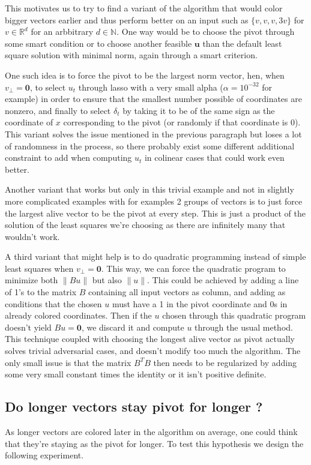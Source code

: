 \documentclass[12pt]{article}
\begin{document}
This motivates us to try to find a variant of the algorithm that would color bigger vectors earlier and thus perform better on an input such as $\{v,v,v,3v\}$ for $v\in\mathbb{R}^d$ for an arbbitrary $d\in\mathbb{N}$. One way would be to choose the pivot through some smart condition or to choose another feasible $\textbf{u}$ than the default least square solution with minimal norm, again through a smart criterion.

One such idea is to force the pivot to be the largest norm vector, hen, when $v_\perp=\textbf{0}$, to select $u_t$ through lasso with a very small alpha ($\alpha=10^{-32}$ for example) in order to ensure that the smallest number possible of coordinates are nonzero, and finally to select $\delta_t$ by taking it to be of the same sign as the coordinate of $x$ corresponding to the pivot (or randomly if that coordinate is 0). This variant solves the issue mentioned in the previous paragraph but loses a lot of randomness in the process, so there probably exist some different additional constraint to add when computing $u_t$ in colinear cases that could work even better.

Another variant that works but only in this trivial example and not in slightly more complicated examples with for examples 2 groups of vectors is to just force the largest alive vector to be the pivot at every step. This is just a product of the solution of the least squares we're choosing as there are infinitely many that wouldn't work.

A third variant that might help is to do quadratic programming instead of simple least squares when $v_\perp=\textbf{0}$. This way, we can force the quadratic program to minimize both $\|Bu\|$ but also $\|u\|$. This could be achieved by adding a line of 1's to the matrix $B$ containing all input vectors as column, and adding as conditions that the chosen $u$ must have a 1 in the pivot coordinate and 0s in already colored coordinates. Then if the $u$ chosen through this quadratic program doesn't yield $Bu=\textbf{0}$, we discard it and compute $u$ through the usual method. This technique coupled with choosing the longest alive vector as pivot actually solves trivial adversarial cases, and doesn't modify too much the algorithm. The only small issue is that the matrix $B^TB$ then needs to be regularized by adding some very small constant times the identity or it isn't positive definite.

\subsection{Do longer vectors stay pivot for longer ?}\label{longer_vec_pivot_longer}
As longer vectors are colored later in the algorithm on average, one could think that they're staying as the pivot for longer. To test this hypothesis we design the following experiment.
\end{document}
